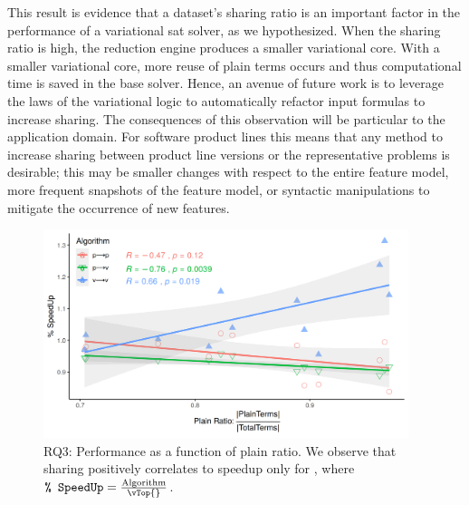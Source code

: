 This result is evidence that a dataset's sharing ratio is an important factor in
the performance of a variational \ac{sat} solver, as we hypothesized. When the
sharing ratio is high, the reduction engine produces a smaller variational core.
With a smaller variational core, more reuse of plain terms occurs and thus
computational time is saved in the base solver. Hence, an avenue of future work
is to leverage the laws of the variational logic to automatically refactor input
formulas to increase sharing. The consequences of this observation will be
particular to the application domain. For software product lines this means that
any method to increase sharing between product line versions or the
representative \sat{} problems is desirable; this may be smaller changes with
respect to the entire feature model, more frequent snapshots of the feature
model, or syntactic manipulations to mitigate the occurrence of new features.

\begin{figure}
  \includegraphics[width=0.95\textwidth]{Plots/RQ3}
  \caption{RQ3: Performance as a function of plain ratio. We observe that
    sharing positively correlates to speedup only for \vTov{}, where $\texttt{\%
      SpeedUp} = \frac{{\text{Algorithm}}}{{\text{\vTop{}}}}$.}%
  \label{res:speedup}
\end{figure}

